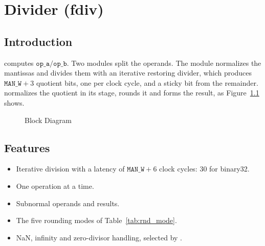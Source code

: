 \chapter{Divider (fdiv)}
\label{ch:fdiv}

\section{Introduction}

 computes $\mathtt{op\_a}/\mathtt{op\_b}$. Two  modules
split the operands. The  module normalizes the mantissas and divides them
with an iterative restoring divider, which produces $\mathtt{MAN\_W}+3$ quotient
bits, one per clock cycle, and a sticky bit from the remainder. 
normalizes the quotient in its  stage, rounds it and forms the result, as
Figure~\ref{fig:fdiv} shows.

\begin{figure}[H]
\centering
{}
\caption{ Block Diagram}
\label{fig:fdiv}
\end{figure}

\section{Features}

\begin{itemize}
\item Iterative division with a latency of $\mathtt{MAN\_W}+6$ clock
  cycles: 30 for binary32.
\item One operation at a time.
\item Subnormal operands and results.
\item The five rounding modes of Table~\ref{tab:rnd_mode}.
\item NaN, infinity and zero-divisor handling, selected by .
\end{itemize}

